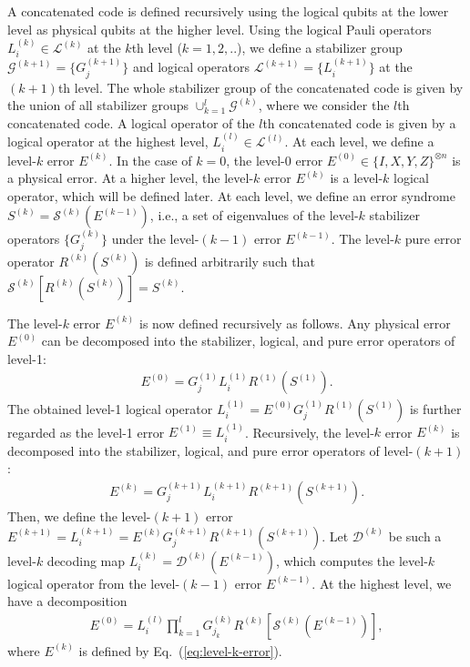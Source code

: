 A concatenated code is defined recursively using the logical qubits at the lower level as physical qubits at the higher level.
Using the logical Pauli operators $L_{i} ^{(k)} \in \mathcal{L}^{(k)}$ at the $k$th level ($k=1,2,..$), we define a stabilizer group $\mathcal{G}^{(k+1)}=\{G_{j}^{(k+1)}\}$ and logical operators $\mathcal{L}^{(k+1)}=\{ L_{i}^{(k+1)}\}$ at the $(k+1)$th level.
The whole stabilizer group of the concatenated code is given by the union of all stabilizer groups $ \cup _{k=1}^{l} \mathcal{G}^{(k)}$, where we consider the $l$th concatenated code.
A logical operator of the $l$th concatenated code is given by a logical operator at the highest level, $L_{i}^{(l)} \in \mathcal{L}^{(l)}$.
At each level, we define a level-$k$ error $E^{(k)}$.
In the case of $k=0$, the level-$0$ error $E^{(0)}\in \{ I, X, Y, Z\}^{\otimes n}$ is a physical error.
At a higher level, the level-$k$ error $E^{(k)}$ is a level-$k$ logical operator, which will be defined later.
At each level, we define an error syndrome $S^{(k)} = \mathcal{S}^{(k)} (E^{(k-1)})$, i.e., a set of eigenvalues of the level-$k$ stabilizer operators $\{G_j^{(k)}\}$ under the level-$(k-1)$ error $E^{(k-1)}$.
The level-$k$ pure error operator $R^{(k)}(S^{(k)})$ is defined arbitrarily such that $\mathcal{S}^{(k)} [R^{(k)}(S^{(k)})] = S^{(k)}$.

The level-$k$ error $E^{(k)}$ is now defined recursively as follows.
Any physical error $E^{(0)}$ can be decomposed into the stabilizer, logical, and pure error operators of level-1:
\begin{eqnarray}
E^{(0)} = G_{j}^{(1)} L_{i}^{(1)} R^{(1)}(S^{(1)}).
\end{eqnarray}
The obtained level-1 logical operator $L_{i}^{(1)} = E^{(0)}G_{j}^{(1)}R^{(1)}(S^{(1)})$ is further regarded as the level-1 error $E^{(1)} \equiv L_i^{(1)}$.
Recursively, the level-$k$ error $E^{(k)}$ is decomposed into the stabilizer, logical, and pure error operators of level-$(k+1)$:
\begin{eqnarray}
E^{(k)}  = G_{j}^{(k+1)} L_{i} ^{(k+1)} R^{(k+1)}(S^{(k+1)}).
\label{eq:level-k-error}
\end{eqnarray}
Then, we define the level-$(k+1)$ error $E^{(k+1)} = L_i^{(k+1)}=E^{(k)}G_{j}^{(k+1)} R^{(k+1)}(S^{(k+1)})$.
Let $\mathcal{D}^{(k)}$ be such a level-$k$ decoding map $L_{i}^{(k)} = \mathcal{D}^{(k)} (E^{(k-1)})$, which computes the level-$k$ logical operator from the level-$(k-1)$ error $E^{(k-1)}$.
At the highest level, we have a decomposition
\begin{eqnarray}
E^{(0)}=L_{i}^{(l)} \prod _{k=1}^{l} G_{j_k}^{(k)} R^{(k)}[\mathcal{S}^{(k)}(E^{(k-1)})],
\label{eq:error_decomposition}
\end{eqnarray} 
where $E^{(k)}$ is defined by Eq.\ (\ref{eq:level-k-error}).

